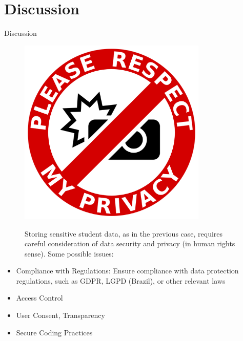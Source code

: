\section{Discussion}

\begin{frame}{Discussion}

    \begin{figure}
        \centering
        \begin{minipage}{.25\textwidth}
          \centering
          \includegraphics[width=0.8\textwidth]{../../images/privacy.png}
        \end{minipage}%
        \begin{minipage}{.7\textwidth}
            Storing sensitive student data, as in the previous case, requires careful consideration 
            of data security and privacy (in human rights sense). 
            Some possible issues:
        \end{minipage}
    \end{figure}

    \begin{itemize}[<alert@+>]\color{gray}
        \item Compliance with Regulations: Ensure compliance with data protection regulations, such as GDPR, LGPD (Brazil), or other relevant laws
        \item Access Control
        \item User Consent, Transparency
        \item Secure Coding Practices
    \end{itemize}
    
\end{frame}

